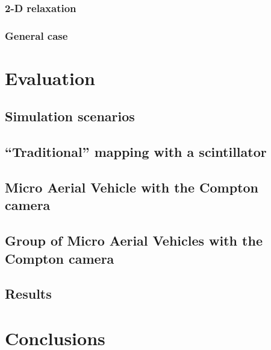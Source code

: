 \documentclass[a4paper,11pt,titlepage,twoside]{book}
\begin{document}
\subsection{2-D relaxation}

\subsection{General case}



\chapter{Evaluation}


\section{Simulation scenarios}

\section{``Traditional'' mapping with a scintillator}

\section{Micro Aerial Vehicle with the Compton camera}

\section{Group of Micro Aerial Vehicles with the Compton camera}

\section{Results}



\chapter{Conclusions}
\end{document}
